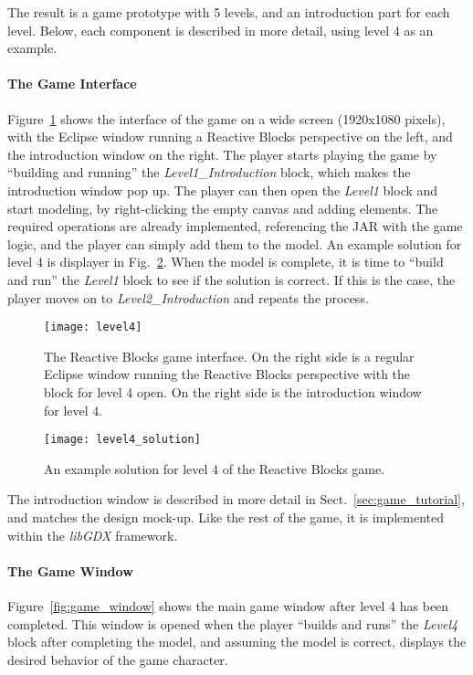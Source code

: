 \noindent
The result is a game prototype with 5 levels, and an introduction part for each level. Below, each component is described in more detail, using level 4 as an example.

\paragraph{The Game Interface}
Figure~\ref{fig:level4} shows the interface of the game on a wide screen (1920x1080 pixels), with the Eclipse window running a Reactive Blocks perspective on the left, and the introduction window on the right. The player starts playing the game by ``building and running'' the \emph{Level1\_Introduction} block, which makes the introduction window pop up. The player can then open the \emph{Level1} block and start modeling, by right-clicking the empty canvas and adding elements. The required operations are already implemented, referencing the JAR with the game logic, and the player can simply add them to the model. An example solution for level 4 is displayer in Fig.~\ref{fig:level4_solution}. When the model is complete, it is time to ``build and run'' the \emph{Level1} block to see if the solution is correct. If this is the case, the player moves on to \emph{Level2\_Introduction} and repeats the process.

\begin{figure}[htp]
	\centering
	\texttt{[image: level4]}
	\caption[The Reactive Blocks game interface]{The Reactive Blocks game interface. On the right side is a regular Eclipse window running the Reactive Blocks perspective with the block for level 4 open. On the right side is the introduction window for level 4.}
	\label{fig:level4}
\end{figure}

\begin{figure}[htp]
	\centering
	\texttt{[image: level4\_solution]}
	\caption[Level 4 solution]{An example solution for level 4 of the Reactive Blocks game.}
	\label{fig:level4_solution}
\end{figure}

\noindent
The introduction window is described in more detail in Sect.~\ref{sec:game_tutorial}, and matches the design mock-up. Like the rest of the game, it is implemented within the \emph{libGDX} framework.

\paragraph{The Game Window}
Figure~\ref{fig:game_window} shows the main game window after level 4 has been completed. This window is opened when the player ``builds and runs'' the \emph{Level4} block after completing the model, and assuming the model is correct, displays the desired behavior of the game character.

